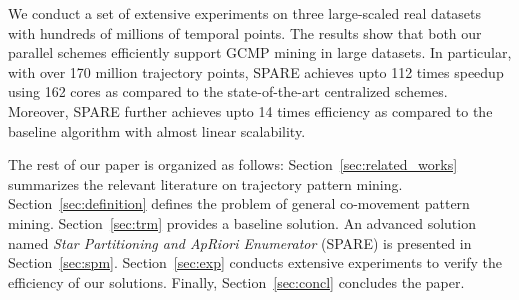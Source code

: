 We conduct a set of extensive experiments on three large-scaled real datasets with hundreds of millions of
temporal points. 
The results show that both our parallel schemes efficiently support GCMP mining in large datasets.
In particular, with over 170 million trajectory points,
SPARE achieves upto 112 times speedup using 162 cores as compared to the state-of-the-art centralized schemes.
Moreover, SPARE further achieves upto 14 times efficiency
as compared to the baseline algorithm with almost linear scalability.

The rest of our paper is organized as follows: Section~\ref{sec:related_works} summarizes the relevant literature on 
trajectory pattern mining. Section~\ref{sec:definition} defines the problem of general co-movement pattern mining. Section~\ref{sec:trm} provides a baseline solution. An advanced solution named
\emph{Star Partitioning and ApRiori Enumerator} (SPARE) is presented in Section~\ref{sec:spm}. Section~\ref{sec:exp} conducts extensive experiments to verify the efficiency of our solutions. Finally, Section~\ref{sec:concl} concludes the paper.
